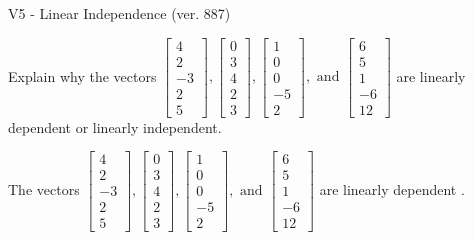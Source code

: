 \begin{exercise}
  \begin{exerciseTitle}V5 - Linear Independence (ver. 887)\end{exerciseTitle}
  \begin{exerciseStatement}
    Explain why the vectors \(\left[\begin{array}{r}
4 \\
2 \\
-3 \\
2 \\
5
\end{array}\right] , \left[\begin{array}{r}
0 \\
3 \\
4 \\
2 \\
3
\end{array}\right] , \left[\begin{array}{r}
1 \\
0 \\
0 \\
-5 \\
2
\end{array}\right] , \text{ and } \left[\begin{array}{r}
6 \\
5 \\
1 \\
-6 \\
12
\end{array}\right]\) are linearly dependent or linearly independent.	


  \end{exerciseStatement}
  \begin{exerciseAnswer}
   The vectors \(\left[\begin{array}{r}
4 \\
2 \\
-3 \\
2 \\
5
\end{array}\right] , \left[\begin{array}{r}
0 \\
3 \\
4 \\
2 \\
3
\end{array}\right] , \left[\begin{array}{r}
1 \\
0 \\
0 \\
-5 \\
2
\end{array}\right] , \text{ and } \left[\begin{array}{r}
6 \\
5 \\
1 \\
-6 \\
12
\end{array}\right]\) are 
  	 linearly dependent  .
  


  \end{exerciseAnswer}
\end{exercise}